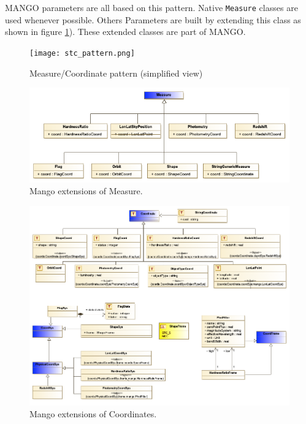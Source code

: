 \documentclass[11pt,a4paper]{ivoa}
\begin{document}
MANGO parameters are all based on this pattern. 
Native  \texttt{Measure} classes are used whenever possible. 
Others Parameters are built by extending this class as shown in figure \ref{fig:stcpattern}). 
These extended classes are part of MANGO.
\begin{figure}
     \texttt{[image: stc\_pattern.png]}
     \caption{Measure/Coordinate pattern (simplified view)}
     \label{fig:stcpattern}
\end{figure}

\begin{figure}
  \includegraphics[width=1.0\textwidth]{../model/mangoMeasures.png}
  \caption{Mango extensions of Measure.}
  \label{fig:measures}
\end{figure}

\begin{figure}
  \includegraphics[width=1.0\textwidth]{../model/mangoCoordinates.png}
  \caption{Mango extensions of Coordinates.}
  \label{fig:coordinates}
\end{figure}
\end{document}
